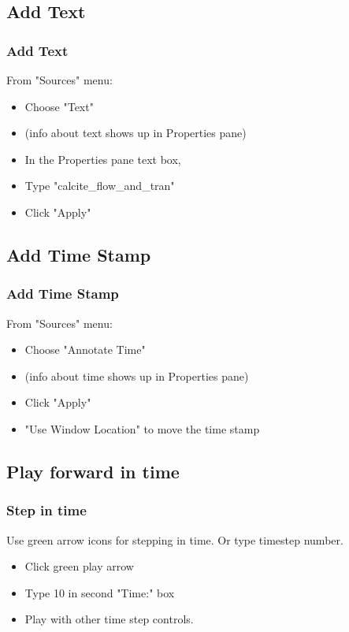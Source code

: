 \documentclass{beamer}
\begin{document}
\subsection{Add Text}

\begin{frame}[fragile]\frametitle{Add Text}
From "Sources" menu:

\begin{itemize}
  \item Choose "Text"
  \item (info about text shows up in Properties pane)
  \item In the Properties pane text box,
  \item Type "calcite\_flow\_and\_tran"
  \item Click "Apply"
\end{itemize}

\end{frame}

\subsection{Add Time Stamp}

\begin{frame}[fragile]\frametitle{Add Time Stamp}
From "Sources" menu:

\begin{itemize}
  \item Choose "Annotate Time"
  \item (info about time shows up in Properties pane)
  \item Click "Apply"
  \item "Use Window Location" to move the time stamp
\end{itemize}

\end{frame}

\subsection{Play forward in time}

\begin{frame}[fragile]\frametitle{Step in time}
Use green arrow icons for stepping in time. Or type timestep number.

\begin{itemize}
  \item Click green play arrow 
  \item Type 10 in second "Time:" box 
  \item Play with other time step controls.
\end{itemize}

\end{frame}

\end{document}
